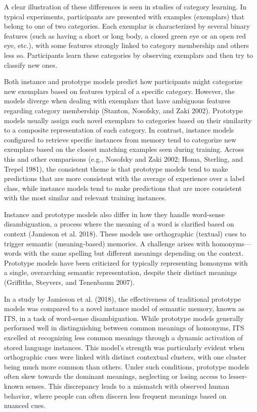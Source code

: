 \documentclass[
  letterpaper,
  11pt,
  english,
  singlespacing,
  headsepline]{MastersDoctoralThesis}
\begin{document}
A clear illustration of these differences is seen in studies of category
learning. In typical experiments, participants are presented with
examples (exemplars) that belong to one of two categories. Each exemplar
is characterized by several binary features (such as having a short or
long body, a closed green eye or an open red eye, etc.), with some
features strongly linked to category membership and others less so.
Participants learn these categories by observing exemplars and then try
to classify new ones.

Both instance and prototype models predict how participants might
categorize new exemplars based on features typical of a specific
category. However, the models diverge when dealing with exemplars that
have ambiguous features regarding category membership (Stanton,
Nosofsky, and Zaki 2002). Prototype models usually assign such novel
exemplars to categories based on their similarity to a composite
representation of each category. In contrast, instance models configured
to retrieve specific instances from memory tend to categorize new
exemplars based on the closest matching examples seen during training.
Across this and other comparisons (e.g., Nosofsky and Zaki 2002; Homa,
Sterling, and Trepel 1981), the consistent theme is that prototype
models tend to make predictions that are more consistent with the
average of experience over a label class, while instance models tend to
make predictions that are more consistent with the most similar and
relevant training instances.

Instance and prototype models also differ in how they handle word-sense
disambiguation, a process where the meaning of a word is clarified based
on context (Jamieson et al. 2018). These models use orthographic
(textual) cues to trigger semantic (meaning-based) memories. A challenge
arises with homonyms---words with the same spelling but different
meanings depending on the context. Prototype models have been criticized
for typically representing homonyms with a single, overarching semantic
representation, despite their distinct meanings (Griffiths, Steyvers,
and Tenenbaum 2007).

In a study by Jamieson et al. (2018), the effectiveness of traditional
prototype models was compared to a novel instance model of semantic
memory, known as ITS, in a task of word-sense disambiguation. While
prototype models generally performed well in distinguishing between
common meanings of homonyms, ITS excelled at recognizing less common
meanings through a dynamic activation of stored language instances. This
model's strength was particularly evident when orthographic cues were
linked with distinct contextual clusters, with one cluster being much
more common than others. Under such conditions, prototype models often
skew towards the dominant meanings, neglecting or losing access to
lesser-known senses. This discrepancy leads to a mismatch with observed
human behavior, where people can often discern less frequent meanings
based on nuanced cues.
\end{document}
